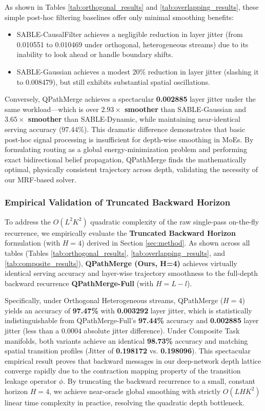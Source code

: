 As shown in Tables \ref{tab:orthogonal_results} and \ref{tab:overlapping_results}, these simple post-hoc filtering baselines offer only minimal smoothing benefits:
\begin{itemize}
    \item SABLE-CausalFilter achieves a negligible reduction in layer jitter (from 0.010551 to 0.010469 under orthogonal, heterogeneous streams) due to its inability to look ahead or handle boundary shifts.
    \item SABLE-Gaussian achieves a modest 20\% reduction in layer jitter (slashing it to 0.008479), but still exhibits substantial spatial oscillations.
\end{itemize}
Conversely, QPathMerge achieves a spectacular \textbf{0.002885} layer jitter under the same workload---which is over \textbf{$2.93\times$ smoother} than SABLE-Gaussian and \textbf{$3.65\times$ smoother} than SABLE-Dynamic, while maintaining near-identical serving accuracy (97.44\%). This dramatic difference demonstrates that basic post-hoc signal processing is insufficient for depth-wise smoothing in MoEs. By formulating routing as a global energy-minimization problem and performing exact bidirectional belief propagation, QPathMerge finds the mathematically optimal, physically consistent trajectory across depth, validating the necessity of our MRF-based solver.

\subsubsection{Empirical Validation of Truncated Backward Horizon}
To address the $O(L^2 K^2)$ quadratic complexity of the raw single-pass on-the-fly recurrence, we empirically evaluate the \textbf{Truncated Backward Horizon} formulation (with $H = 4$) derived in Section \ref{sec:method}. As shown across all tables (Tables \ref{tab:orthogonal_results}, \ref{tab:overlapping_results}, and \ref{tab:composite_results}), \textbf{QPathMerge (Ours, H=4)} achieves virtually identical serving accuracy and layer-wise trajectory smoothness to the full-depth backward recurrence \textbf{QPathMerge-Full} (with $H = L - l$).

Specifically, under Orthogonal Heterogeneous streams, QPathMerge ($H=4$) yields an accuracy of \textbf{97.47\%} with \textbf{0.003292} layer jitter, which is statistically indistinguishable from QPathMerge-Full's \textbf{97.44\%} accuracy and \textbf{0.002885} layer jitter (less than a $0.0004$ absolute jitter difference). Under Composite Task manifolds, both variants achieve an identical \textbf{98.73\%} accuracy and matching spatial transition profiles (Jitter of \textbf{0.198172} vs. \textbf{0.198096}). This spectacular empirical result proves that backward messages in our deep-network depth lattice converge rapidly due to the contraction mapping property of the transition leakage operator $\phi$. By truncating the backward recurrence to a small, constant horizon $H = 4$, we achieve near-oracle global smoothing with strictly $O(L H K^2)$ linear time complexity in practice, resolving the quadratic depth bottleneck.

